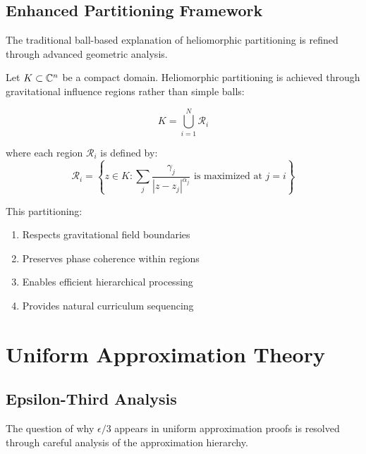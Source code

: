 \subsection{Enhanced Partitioning Framework}

The traditional ball-based explanation of heliomorphic partitioning is refined through advanced geometric analysis.

\begin{theorem}
\label{thm:improved_partitioning}
Let $K \subset \mathbb{C}^n$ be a compact domain. Heliomorphic partitioning is achieved through gravitational influence regions rather than simple balls:

\begin{equation}
K = \bigcup_{i=1}^{N} \mathcal{R}_i
\end{equation}

where each region $\mathcal{R}_i$ is defined by:
\begin{equation}
\mathcal{R}_i = \left\{z \in K : \sum_{j} \frac{\gamma_j}{|z - z_j|^{\alpha_j}} \text{ is maximized at } j = i\right\}
\end{equation}

This partitioning:
\begin{enumerate}
    \item Respects gravitational field boundaries
    \item Preserves phase coherence within regions  
    \item Enables efficient hierarchical processing
    \item Provides natural curriculum sequencing
\end{enumerate}
\end{theorem}

\section{Uniform Approximation Theory}

\subsection{Epsilon-Third Analysis}

The question of why $\epsilon/3$ appears in uniform approximation proofs is resolved through careful analysis of the approximation hierarchy.

